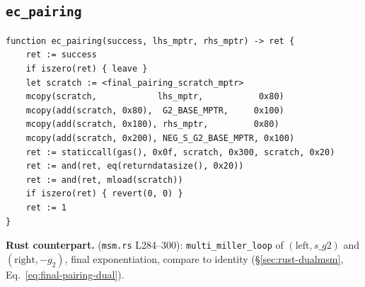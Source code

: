 \subsection{\texttt{ec\_pairing}}
\label{sec:ec-pairing}

\begin{lstlisting}[style=yul]
function ec_pairing(success, lhs_mptr, rhs_mptr) -> ret {
    ret := success
    if iszero(ret) { leave }
    let scratch := <final_pairing_scratch_mptr>
    mcopy(scratch,            lhs_mptr,           0x80)
    mcopy(add(scratch, 0x80),  G2_BASE_MPTR,     0x100)
    mcopy(add(scratch, 0x180), rhs_mptr,         0x80)
    mcopy(add(scratch, 0x200), NEG_S_G2_BASE_MPTR, 0x100)
    ret := staticcall(gas(), 0x0f, scratch, 0x300, scratch, 0x20)
    ret := and(ret, eq(returndatasize(), 0x20))
    ret := and(ret, mload(scratch))
    if iszero(ret) { revert(0, 0) }
    ret := 1
}
\end{lstlisting}

\textbf{Rust counterpart.} 
(\texttt{msm.rs} L284--300):
\texttt{multi\_\allowbreak{}miller\_\allowbreak{}loop} of $(\text{left}, s\_g2)$ and
$(\text{right}, -g_2)$, final exponentiation, compare to identity
(\S\ref{sec:rust-dualmsm}, Eq.~\eqref{eq:final-pairing-dual}).

